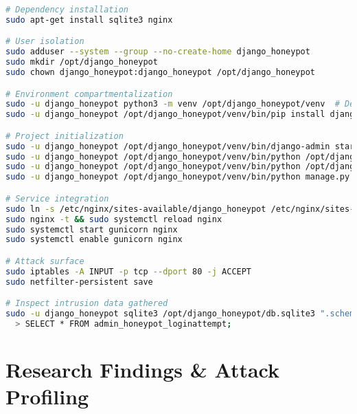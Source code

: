 \documentclass{cls/ULBreport}
\begin{document}
\begin{lstlisting}[language=bash,label={lst:cowrie-context},caption={Setup of a Django Honeypot Webservice}]  
# Dependency installation
sudo apt-get install sqlite3 nginx

# User isolation
sudo adduser --system --group --no-create-home django_honeypot
sudo mkdir /opt/django_honeypot
sudo chown django_honeypot:django_honeypot /opt/django_honeypot

# Environment compartmentalization
sudo -u django_honeypot python3 -m venv /opt/django_honeypot/venv  # Dependency isolation
sudo -u django_honeypot /opt/django_honeypot/venv/bin/pip install django django-admin-honeypot gunicorn

# Project initialization
sudo -u django_honeypot /opt/django_honeypot/venv/bin/django-admin startproject honeypot_project /opt/django_honeypot
sudo -u django_honeypot /opt/django_honeypot/venv/bin/python /opt/django_honeypot/manage.py makemigrations
sudo -u django_honeypot /opt/django_honeypot/venv/bin/python /opt/django_honeypot/manage.py migrate
sudo -u django_honeypot /opt/django_honeypot/venv/bin/python manage.py collectstatic

# Service integration
sudo ln -s /etc/nginx/sites-available/django_honeypot /etc/nginx/sites-enabled/ # Exposure
sudo nginx -t && sudo systemctl reload nginx
sudo systemctl start gunicorn nginx
sudo systemctl enable gunicorn nginx

# Attack surface
sudo iptables -A INPUT -p tcp --dport 80 -j ACCEPT
sudo netfilter-persistent save

# Inspect intrusion data gathered
sudo -u django_honeypot sqlite3 /opt/django_honeypot/db.sqlite3 ".schema admin_honeypot_loginattempt"  # Verify capture schema
  > SELECT * FROM admin_honeypot_loginattempt;\end{lstlisting}  


\section{Research Findings \& Attack Profiling}
 
\end{document}
